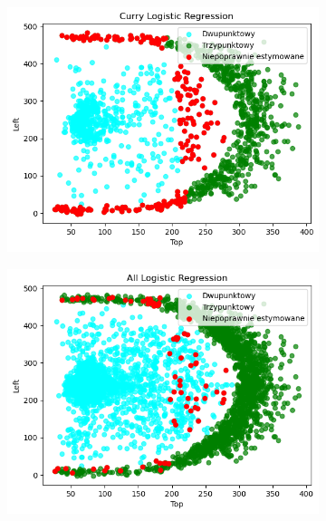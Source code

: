 \documentclass{beamer}
\begin{document}
\begin{frame}
\begin{figure}
\begin{subfigure}[b]{0.45\textwidth}
		\end{subfigure}
		
		\begin{subfigure}[b]{0.45\textwidth}
			\includegraphics[width=\linewidth, height=0.45\textheight]{E_Logistic1_scatter.png}
		\end{subfigure}
		\begin{subfigure}[b]{0.45\textwidth}
			\includegraphics[width=\linewidth, height=0.45\textheight]{E_Logistic_all_scatter.png}
		\end{subfigure}
	\end{figure}
\end{frame}
\end{document}
